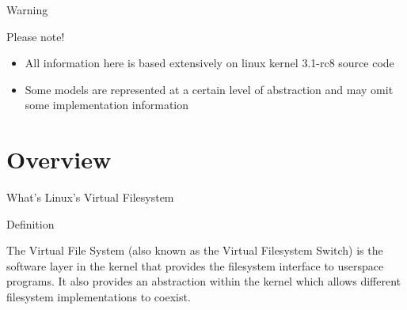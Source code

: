 \documentclass{beamer}
\begin{document}
\begin{frame}{Warning}

  \begin{block}{Please note!}

	\begin{itemize}[<+->]

		\item{All information here is based extensively on linux kernel 3.1-rc8 source code\footnotemark[1]}

		\item{Some models are represented at a certain level of abstraction and may omit some implementation information}
	
	\end{itemize}

  \end{block}


\end{frame}

\section{Overview}

\begin{frame}{What's Linux's Virtual Filesystem}

  \begin{block}{Definition}

	The Virtual File System (also known as the Virtual Filesystem Switch)
	is the software layer in the kernel that provides the filesystem
	interface to userspace programs. It also provides an abstraction
	within the kernel which allows different filesystem implementations to
	coexist. \footnotemark[1]

  \end{block}


\end{frame}
\end{document}
